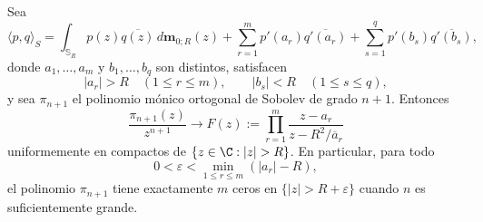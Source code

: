 \begin{lem}\label{lem:desacople_mixto_sin_frontera}
	Sea
	\[
		\langle p,q\rangle_S
		=
		\int_{\mathbb S_R}p(z)\overline{q(z)}\,d\mathbf m_{0;R}(z)
		+
		\sum_{r=1}^{m} p'(a_r)\overline{q'(a_r)}
		+
		\sum_{s=1}^{q} p'(b_s)\overline{q'(b_s)},
	\]
	donde $a_1,\dots,a_m$ y $b_1,\dots,b_q$ son distintos, satisfacen
	\[
		|a_r|>R \quad (1\le r\le m),
		\qquad
		|b_s|<R \quad (1\le s\le q),
	\]
	y sea $\pi_{n+1}$ el polinomio mónico ortogonal de Sobolev de grado $n+1$. Entonces
	\[
		\frac{\pi_{n+1}(z)}{z^{n+1}}
		\longrightarrow
		F(z):=\prod_{r=1}^m\frac{z-a_r}{z-R^2/\overline a_r}
	\]
	uniformemente en compactos de $\{z\in\C:|z|>R\}$. En particular, para todo
	\[
		0<\varepsilon<\min_{1\le r\le m}(|a_r|-R),
	\]
	el polinomio $\pi_{n+1}$ tiene exactamente $m$ ceros en $\{|z|>R+\varepsilon\}$ cuando $n$ es suficientemente grande.
\end{lem}

